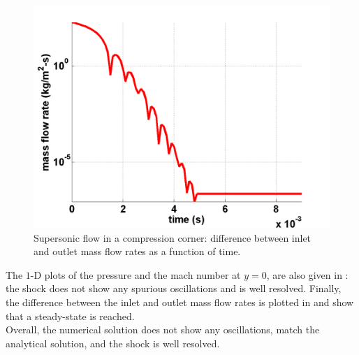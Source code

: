         \begin{figure}[H]%
                \centering
                \includegraphics[width=\textwidth]{figures/CompressionCorner2DQ.png}
                \caption{Supersonic flow in a compression corner: difference between inlet and outlet mass flow rates as a function of time.}
                \label{fig:2d_convergence}
        \end{figure}
The $1$-D plots of the pressure and the mach number at $y=0$, are also given in : the shock does not show any spurious oscillations and is well resolved. Finally, the difference between the inlet and outlet mass flow rates is plotted in  and show that a steady-state is reached. \\
Overall, the numerical solution does not show any oscillations, match the analytical solution, and the shock is well resolved.
